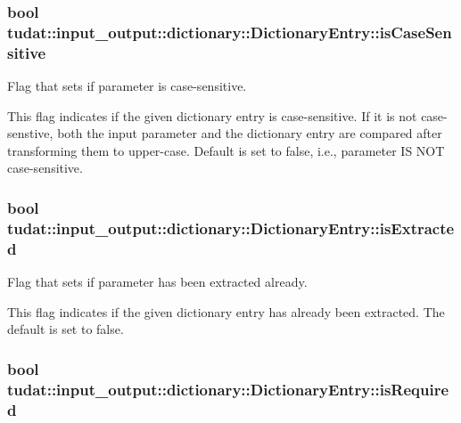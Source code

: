\subsubsection[{\texorpdfstring{is\+Case\+Sensitive}{isCaseSensitive}}]{\setlength{\rightskip}{0pt plus 5cm}bool tudat\+::input\+\_\+output\+::dictionary\+::\+Dictionary\+Entry\+::is\+Case\+Sensitive}\hypertarget{structtudat_1_1input__output_1_1dictionary_1_1DictionaryEntry_a3c8b68c9840e1ea643325fb8f06c5c04}{}\label{structtudat_1_1input__output_1_1dictionary_1_1DictionaryEntry_a3c8b68c9840e1ea643325fb8f06c5c04}


Flag that sets if parameter is case-\/sensitive. 

This flag indicates if the given dictionary entry is case-\/sensitive. If it is not case-\/senstive, both the input parameter and the dictionary entry are compared after transforming them to upper-\/case. Default is set to false, i.\+e., parameter IS N\+OT case-\/sensitive. 
\subsubsection[{\texorpdfstring{is\+Extracted}{isExtracted}}]{\setlength{\rightskip}{0pt plus 5cm}bool tudat\+::input\+\_\+output\+::dictionary\+::\+Dictionary\+Entry\+::is\+Extracted}\hypertarget{structtudat_1_1input__output_1_1dictionary_1_1DictionaryEntry_a347ec4c8fe97ae87358fd671688a4944}{}\label{structtudat_1_1input__output_1_1dictionary_1_1DictionaryEntry_a347ec4c8fe97ae87358fd671688a4944}


Flag that sets if parameter has been extracted already. 

This flag indicates if the given dictionary entry has already been extracted. The default is set to false. 
\subsubsection[{\texorpdfstring{is\+Required}{isRequired}}]{\setlength{\rightskip}{0pt plus 5cm}bool tudat\+::input\+\_\+output\+::dictionary\+::\+Dictionary\+Entry\+::is\+Required}\hypertarget{structtudat_1_1input__output_1_1dictionary_1_1DictionaryEntry_a3c4df6676ee88eac7eb79cf61f75d9f7}{}\label{structtudat_1_1input__output_1_1dictionary_1_1DictionaryEntry_a3c4df6676ee88eac7eb79cf61f75d9f7}


